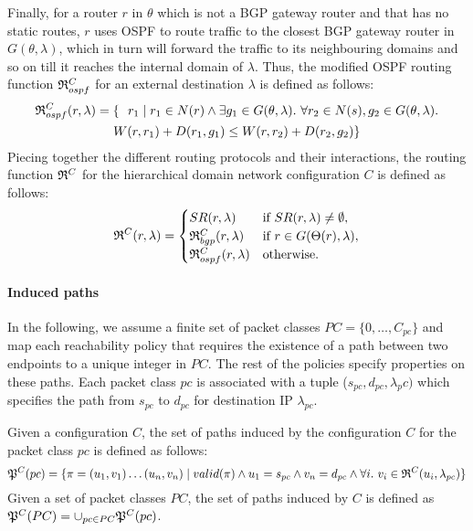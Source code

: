 Finally, for a router $r$ in $\theta$ which is not a BGP gateway 
router and that has no static routes, $r$ uses OSPF to route traffic to the closest BGP
gateway router in $G (\theta, \lambda)$, which in turn will forward  the traffic to its neighbouring domains and so on till it reaches the internal domain of $\lambda$.  Thus, the modified OSPF routing 
function $\mathfrak{R}^C_{ospf}$ for an external destination $\lambda$
is defined as follows: 
\begin{multline*}
\mathfrak{R}_{ospf}^C(r,\lambda) = \{~~r_1 \mid r_1 \in N(r) \wedge \exists g_1 \in G (\theta, \lambda). ~\forall r_2 \in N(s), g_2 \in G (\theta, \lambda). \\
W(r, r_1) + D(r_1, g_1) \leq
W(r, r_2) + D(r_2, g_2)\}
\end{multline*}
Piecing together the different routing protocols and their 
interactions, the routing function 
$\mathfrak{R}^C$ for the hierarchical domain network configuration $C$ is defined as follows: 
\[
\mathfrak{R}^C(r, \lambda) = 
\begin{cases}
SR(r, \lambda) & \text{if } SR(r, \lambda) \not= \emptyset, \\
\mathfrak{R}_{bgp}^C(r, \lambda) & \text{if }r \in G(\Theta(r), \lambda), \\
\mathfrak{R}_{ospf}^C(r, \lambda) & \text{otherwise.} 
\end{cases}
\]

\paragraph{Induced paths}
In the following, we assume a finite set of packet classes $PC = \{0, \ldots, C_{pc}\}$ 
and map each reachability
policy that requires the existence of a path between two endpoints
to a unique integer in $PC$. The rest of the policies specify 
properties on these paths. Each packet class $pc$ is associated
with a tuple ($s_{pc}, d_{pc}, \lambda_pc)$ which specifies 
the path from $s_{pc}$ to $d_{pc}$ for destination IP $\lambda_{pc}$.

\begin{definition} \label{def:inducedpaths}
Given a configuration $C$, the set of paths induced
by the configuration $C$ for the packet class $pc$ is defined as follows:
\[
\mathfrak{P}^C(pc) = \{\pi=(u_1, v_1)\ldots (u_n, v_n) \mid 
valid(\pi) \wedge 
u_1 = s_{pc} \wedge v_n= d_{pc} \wedge
\forall i. ~v_i \in \mathfrak{R}^C(u_i,\lambda_{pc})\}
\]
Given a set of packet classes $PC$, the set of paths
 induced by $C$ is defined as
$\mathfrak{P}^C(PC) = \cup_{pc\in PC} \mathfrak{P}^C(pc)$.
\end{definition}

